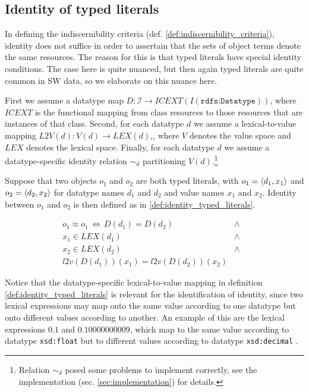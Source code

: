 \subsection{Identity of typed literals}

In defining the indiscernibility criteria
  (def. \ref{def:indiscernibility_criteria}),
  identity does not suffice in order to assertain that
  the sets of object terms denote the same resources.
The reason for this is that typed literals have special identity conditions.
The case here is quite nuanced,
  but then again typed literals are quite common in SW data,
  so we elaborate on this nuance here.

First we assume a datatype map
  $D : \mathcal{I} \rightarrow ICEXT(I(\texttt{rdfs:Datatype}))$,
  where $ICEXT$ is the functional mapping from class resources
  to those resources that are instances of that class.
Second, for each datatype $d$ we assume a lexical-to-value mapping
  $L2V(d) : V(d) \rightarrow LEX(d)$,\cite{Hayes2004},
  where $V$ denotes the value space and $LEX$ denotes the lexical space.
Finally, for each datatype $d$ we assume a datatype-specific identity relation
  $\sim_d$ partitioning $V(d)$.\footnote{
    Relation $\sim_d$ posed some problems to implement correctly,
      see the implementation (sec. \ref{sec:implementation}) for details.
    }

Suppose that two objects $o_1$ and $o_2$ are both typed literals,
  with $o_1 = \langle d_1,x_1\rangle$ and $o_2 = \langle d_2,x_2\rangle$
  for datatype names $d_1$ and $d_2$ and value names $x_1$ and $x_2$.
Identity between $o_1$ and $o_2$ is then defined as in
  \ref{def:identity_typed_literals}.

\small
\begin{definition}
\label{def:identity_typed_literals}
\begin{align}
  o_1 \approx o_1
\,\iff\,
    D(d_1) = D(d_2)
  &\land&\\
    x_1 \in LEX(d_1)
  &\land&\nonumber\\
    x_2 \in LEX(d_2)
  &\land&\nonumber\\
    l2v(D(d_1))(x_1) = l2v(D(d_2))(x_2)\nonumber
\end{align}
\end{definition}
\normalsize

\noindent Notice that the datatype-specific lexical-to-value mapping
  in definition \ref{def:identity_typed_literals} is relevant for
  the identification of identity,
  since two lexical expressions may map onto the same value
  according to one datatype but onto different values
  according to another.
An example of this are the lexical expressions $0.1$ and $0.10000000009$,
  which map to the same value according to datatype \texttt{xsd:float}
  but to different values according to datatype \texttt{xsd:decimal}
  \cite{Goldberg1991}.

